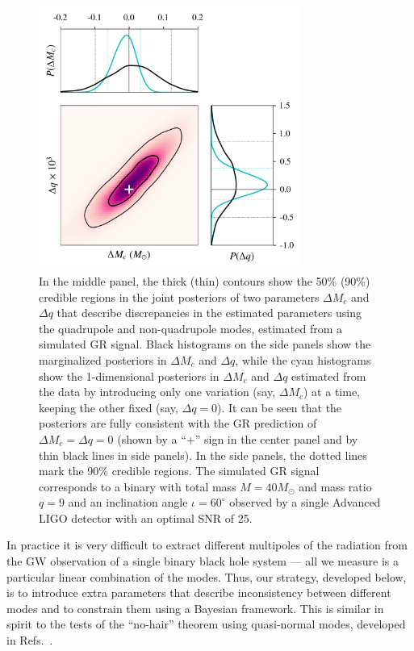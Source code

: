 \documentclass[prl,preprintnumbers,twocolumn,eqsecnum,floatfix,a4paper,nofootinbib,superscriptaddress]{revtex4}
\begin{document}
\begin{figure}[htb] \begin{center}
\includegraphics[width=3.4in]{figs/fig1_gr_9dim_abhi.png}
\caption{In the middle panel, the thick (thin) contours show the 50\% (90\%) credible regions in the joint posteriors of two parameters $\Delta M_c$ and $\Delta q$ that describe discrepancies in the estimated parameters using the quadrupole and non-quadrupole modes, estimated from a simulated GR signal. Black histograms on the side panels show the marginalized posteriors in $\Delta M_c$ and $\Delta q$, while the cyan histograms show the 1-dimensional posteriors in $\Delta M_c$ and $\Delta q$ estimated from the data by introducing only one variation (say, $\Delta M_c$) at a time, keeping the other fixed (say, $\Delta q = 0$). It can be seen that the posteriors are fully consistent with the GR prediction of $\Delta M_c = \Delta q = 0$ (shown by a ``+'' sign in the center panel and by thin black lines in side panels). In the side panels, the dotted lines mark the 90\% credible regions. The simulated GR signal corresponds to a binary with total mass $M = {40}M_\odot$ and mass ratio $q = 9$ and an inclination angle $\iota = {60^\circ}$ observed by a single Advanced LIGO detector with an optimal SNR of 25. }
\label{fig:contour_plots}
\end{center} \end{figure}
In practice it is very difficult to extract different multipoles of the radiation from the GW observation of a single binary black hole system --- all we measure is a particular linear combination of the modes. Thus, our strategy, developed below, is to introduce extra parameters that describe inconsistency between different modes and to constrain them using a Bayesian framework. This is similar in spirit to the tests of the ``no-hair'' theorem using quasi-normal modes, developed in Refs.~\cite{Gossan:2011ha,Meidam:2014jpa}.
\end{document}
